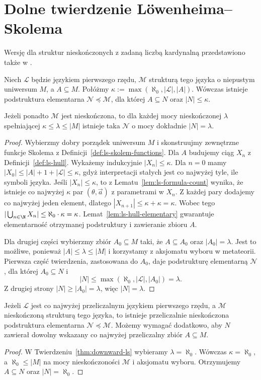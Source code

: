 \section{Dolne twierdzenie Löwenheima--Skolema}
Wersję dla struktur nieskończonych z zadaną liczbą kardynalną przedstawiono także w .

\begin{twierdzenie}
\label{thm:downward-ls}
Niech $\mathcal L$ będzie językiem pierwszego
rzędu, $\mathcal M$ strukturą tego języka
o niepustym uniwersum $M$, a $A\subseteq M$.
Połóżmy $\kappa:=\max(\aleph_0,|\mathcal L|,|A|)$.
Wówczas istnieje podstruktura elementarna
$\mathcal N\preccurlyeq\mathcal M$, dla której
$A\subseteq N$ oraz $|N|\le\kappa$.

Jeżeli ponadto $\mathcal M$ jest nieskończona,
to dla każdej mocy nieskończonej $\lambda$
spełniającej $\kappa\le\lambda\le |M|$
istnieje taka $\mathcal N$ o mocy
dokładnie $|N|=\lambda$.
\end{twierdzenie}
\begin{proof}
Wybierzmy dobry porządek uniwersum $M$
i skonstruujmy zewnętrzne funkcje Skolema
z Definicji~\ref{def:ls-skolem-functions}.
Dla $A$ budujemy ciąg $X_n$
z Definicji~\ref{def:ls-hull}.
Wykażemy indukcyjnie $|X_n|\le\kappa$.
Dla $n=0$ mamy
$|X_0|\le |A|+1+|\mathcal L|\le\kappa$,
gdyż interpretacji stałych jest co najwyżej
tyle, ile symboli języka.
Jeśli $|X_n|\le\kappa$, to
z Lematu~\ref{lem:ls-formula-count}
wynika, że istnieje co najwyżej
$\kappa$ par $(\theta,\vec a)$ z parametrami
w $X_n$. Z każdej pary dodajemy
co najwyżej jeden element, dlatego
$|X_{n+1}|\le\kappa+\kappa=\kappa$.
Wobec tego
$|\bigcup_{n\in\N}X_n|
\le\aleph_0\cdot\kappa=\kappa$.
Lemat~\ref{lem:ls-hull-elementary}
gwarantuje elementarność otrzymanej
podstruktury i zawieranie zbioru $A$.

Dla drugiej części wybierzmy zbiór
$A_0\subseteq M$ taki, że
$A\subseteq A_0$ oraz $|A_0|=\lambda$.
Jest to możliwe, ponieważ
$|A|\le\lambda\le|M|$ i korzystamy
z aksjomatu wyboru w metateorii.
Pierwsza część twierdzenia, zastosowana
do $A_0$, daje podstrukturę elementarną
$\mathcal N$, dla której
$A_0\subseteq N$ i
\[
|N|\le\max(\aleph_0,|\mathcal L|,|A_0|)
     =\lambda.
\]
Z drugiej strony $|N|\ge|A_0|=\lambda$,
więc $|N|=\lambda$.
\end{proof}

\begin{wniosek}
\label{cor:downward-countable}
Jeżeli $\mathcal L$ jest co najwyżej przeliczalnym
językiem pierwszego rzędu, a $\mathcal M$
nieskończoną strukturą tego języka,
to istnieje przeliczalnie nieskończona
podstruktura elementarna
$\mathcal N\preccurlyeq\mathcal M$.
Możemy wymagać dodatkowo, aby $N$
zawierał dowolny wskazany
co najwyżej przeliczalny zbiór $A\subseteq M$.
\end{wniosek}
\begin{proof}
W Twierdzeniu~\ref{thm:downward-ls}
wybieramy $\lambda=\aleph_0$.
Wówczas $\kappa=\aleph_0$, a
$\aleph_0\le|M|$ na mocy nieskończoności
$\mathcal M$ i aksjomatu wyboru.
Otrzymujemy $A\subseteq N$ oraz $|N|=\aleph_0$.
\end{proof}

